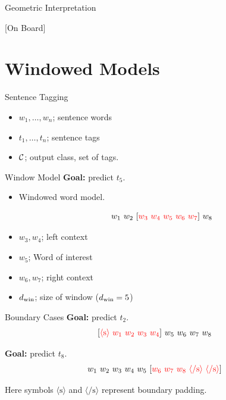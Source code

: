 \documentclass{beamer}
\begin{document}
\begin{frame}{Geometric Interpretation}
  \begin{center}
    [On Board]
  \end{center}
\end{frame}

\section{Windowed Models}


\begin{frame}{}

\end{frame}

\begin{frame}{Sentence Tagging}
  \begin{itemize}
  \item $w_1, \ldots, w_n$; sentence words
    \air
  \item $t_1, \ldots, t_n$; sentence tags
    \air

  \item $\mathcal{C}$; output class, set of tags.
  \end{itemize}
\end{frame}


\begin{frame}{Window Model}
  \textbf{Goal:} predict $t_5$.


  \begin{itemize}
  \item Windowed word model.

  \[ w_1\ w_2\ [\textcolor{red}{w_3\ w_4\ w_5\ w_6\ w_7}]\ w_8 \]

  \item $w_3, w_4$; left context
  \item $w_5$; Word of interest
  \item $w_6, w_7$; right context

  \item ${d_{\mathrm{win}}}$; size of window (${d_{\mathrm{win}}} = 5$)
  \end{itemize}
\end{frame}


\begin{frame}{Boundary Cases}
  \textbf{Goal:} predict $t_2$.
  \[ [\textcolor{red}{ \langle\mathrm{s}\rangle \ w_1\ w_2\ w_3\ w_4}]\ w_5\ w_6\ w_7\ w_8 \]


  \textbf{Goal:} predict $t_8$.
  \[  w_1\ w_2\ w_3\ w_4\ w_5\ [\textcolor{red}{w_6\ w_7\ w_8\  \langle\mathrm{/s}\rangle\ \langle\mathrm{/s}\rangle}] \]

  Here symbols $\langle\mathrm{s}\rangle$ and $\langle\mathrm{/s}\rangle$ represent boundary padding.
\end{frame}
\end{document}
